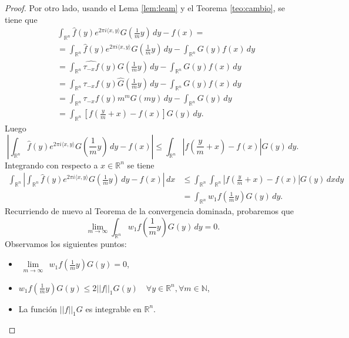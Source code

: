 \begin{proof}
\noindent Por otro lado, usando el Lema \ref {lem:leam} y el Teorema \ref{teo:cambio}, se tiene que
\begin{align}
& \int_{\mathbb{R}^n}\widehat{f}(y)e^{2\pi i \langle x, y \rangle}G\left(\frac{1}{m}y\right) \, dy - f(x) = \\
& = \int_{\mathbb{R}^n}\widehat{f}(y)e^{2\pi i \langle x, y \rangle}G\left(\frac{1}{m}y\right) \, dy - \int_{\mathbb{R}^n}G(y)f(x)\, dy \\
& = \int_{\mathbb{R}^n}\widehat{ \tau_{-x}f}(y)G\left(\frac{1}{m}y\right) \, dy - \int_{\mathbb{R}^n}G(y)f(x)\, dy \\
& = \int_{\mathbb{R}^n} \tau_{-x}f(y)\widehat{G} \left(\frac{1}{m}y\right) \, dy - \int_{\mathbb{R}^n}G(y)f(x)\, dy \\
& = \int_{\mathbb{R}^n} \tau_{-x}f(y) m^mG \left(my\right) \, dy - \int_{\mathbb{R}^n}G(y)\, dy \\
& = \int_{\mathbb{R}^n}[ f(\frac{y}{m}+x)-f(x)] G \left(y\right)\, dy.
\end{align}
Luego
\begin{equation}
    \left|\int_{\mathbb{R}^n}\widehat{f}(y)e^{2\pi i \langle x, y \rangle}G\left(\frac{1}{m}y\right) \, dy - f(x)\right| \leq  \int_{\mathbb{R}^n}\left|f(\frac{y}{m}+x)-f(x) \right| G \left(y\right)\, dy.
\end{equation}
Integrando con respecto a $x \in \mathbb{R}^n$ se tiene
\begin{align}
\int_{\mathbb{R}^n}\left|\int_{\mathbb{R}^n}\widehat{f}(y)e^{2\pi i \langle x, y \rangle}G\left(\frac{1}{m}y\right) \, dy - f(x)\right| \, dx &\leq \int_{\mathbb{R}^n}\int_{\mathbb{R}^n}\left|f(\frac{y}{m}+x)-f(x) \right| G \left(y\right)\, dx dy \nonumber \\
&= \int_{\mathbb{R}^n} w_1f\left(\frac{1}{m}y\right)G(y)\, dy.
\end{align}
Recurriendo de nuevo al Teorema de la convergencia dominada, probaremos que 
\begin{equation}
    \lim_{m \to \infty}  \int_{\mathbb{R}^n} w_1f\left(\frac{1}{m}y\right)G(y)\, dy = 0.
\end{equation}
Observamos los siguientes puntos:
\begin{itemize}
    \item $\underset{\substack{m \rightarrow \infty}}{\lim}\, w_1f\left(\frac{1}{m}y\right)G(y)  = 0$,
    \item $w_1f\left(\frac{1}{m}y\right)G(y) \leq 2||f||_1G(y) \quad \forall y \in \mathbb{R}^n, \forall m \in \mathbb{N}$,
    \item La función $||f||_1G$ es integrable en $\mathbb{R}^n$.

\end{itemize}
\end{proof}
